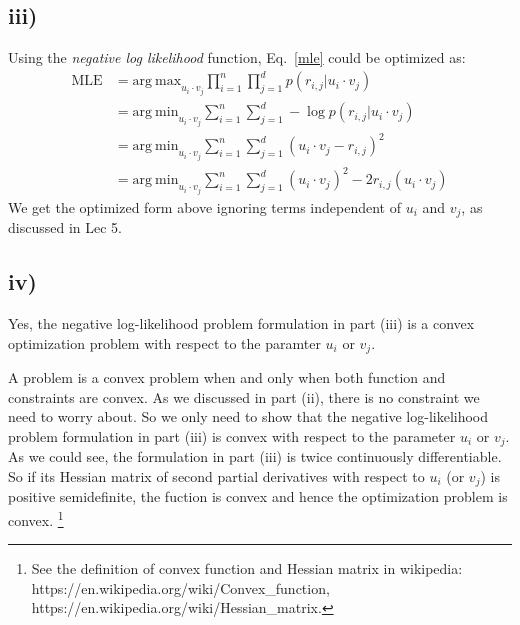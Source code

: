 \documentclass[twoside,11pt]{homework}
\begin{document}
\subsection*{iii)}
Using the \textit{negative log likelihood} function, Eq.~\ref{mle} could be optimized as:
%
\begin{equation}
\begin{split}
\mathrm{MLE} &= \mathrm{arg\ max}_{u_i \cdot v_j} \prod_{i=1}^n \prod_{j=1}^d p(r_{i,j}|u_i \cdot v_j) \\
		      &= \mathrm{arg\ min}_{u_i \cdot v_j} \sum\limits_{i=1}^n \sum\limits_{j=1}^d - \log p(r_{i,j}|u_i \cdot v_j) \\
		      &= \mathrm{arg\ min}_{u_i \cdot v_j} \sum\limits_{i=1}^n \sum\limits_{j=1}^d (u_i \cdot v_j - r_{i, j})^2 \\
		      &= \mathrm{arg\ min}_{u_i \cdot v_j} \sum\limits_{i=1}^n \sum\limits_{j=1}^d (u_i \cdot v_j)^2 - 2r_{i, j} (u_i \cdot v_j)
\label{mle2}		      
\end{split}
\end{equation}
%
We get the optimized form above ignoring terms independent of $u_i$ and $v_j$, as discussed in Lec 5.

\subsection*{iv)}
Yes, the negative log-likelihood problem formulation in part (iii) is a convex optimization problem with respect to the paramter $u_i$ or $v_j$.

A problem is  a convex problem when and only when both function and constraints are convex.
As we discussed in part (ii), there is no constraint we need to worry about.
So we only need to show that the negative log-likelihood problem formulation in part (iii)  is convex with respect to the parameter $u_i$ or $v_j$.
As we could see, the formulation in part (iii) is  twice continuously differentiable. 
So if its Hessian matrix of second partial derivatives with respect to  $u_i$ (or $v_j$) is positive semidefinite, the fuction is convex and hence the optimization problem is convex.
\footnote{See the definition of convex function and Hessian matrix in wikipedia:
https://en.wikipedia.org/wiki/Convex\_function, https://en.wikipedia.org/wiki/Hessian\_matrix.}
\end{document}
